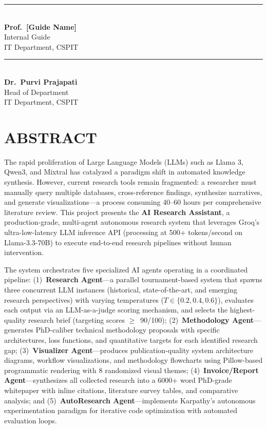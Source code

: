 \documentclass[a4paper,12pt,openany]{report}
\begin{document}
\vspace{2.5cm}
\begin{minipage}[t]{0.45\textwidth}
\centering
\rule{5cm}{0.4pt}\\
\textbf{Prof.\ [Guide Name]}\\
Internal Guide\\
IT Department, CSPIT
\end{minipage}
\hfill
\begin{minipage}[t]{0.45\textwidth}
\centering
\rule{5cm}{0.4pt}\\
\textbf{Dr.\ Purvi Prajapati}\\
Head of Department\\
IT Department, CSPIT
\end{minipage}

\chapter*{ABSTRACT}
The rapid proliferation of Large Language Models (LLMs) such as Llama 3, Qwen3, and Mixtral has catalyzed a paradigm shift in automated knowledge synthesis. However, current research tools remain fragmented: a researcher must manually query multiple databases, cross-reference findings, synthesize narratives, and generate visualizations---a process consuming 40--60 hours per comprehensive literature review. This project presents the \textbf{AI Research Assistant}, a production-grade, multi-agent autonomous research system that leverages Groq's ultra-low-latency LLM inference API (processing at 500+ tokens/second on Llama-3.3-70B) to execute end-to-end research pipelines without human intervention.

The system orchestrates five specialized AI agents operating in a coordinated pipeline: (1)~\textbf{Research Agent}---a parallel tournament-based system that spawns three concurrent LLM instances (historical, state-of-the-art, and emerging research perspectives) with varying temperatures ($T \in \{0.2, 0.4, 0.6\}$), evaluates each output via an LLM-as-a-judge scoring mechanism, and selects the highest-quality research brief (targeting scores $\geq$~90/100); (2)~\textbf{Methodology Agent}---generates PhD-caliber technical methodology proposals with specific architectures, loss functions, and quantitative targets for each identified research gap; (3)~\textbf{Visualizer Agent}---produces publication-quality system architecture diagrams, workflow visualizations, and methodology flowcharts using Pillow-based programmatic rendering with 8 randomized visual themes; (4)~\textbf{Invoice/Report Agent}---synthesizes all collected research into a 6000+ word PhD-grade whitepaper with inline citations, literature survey tables, and comparative analysis; and (5)~\textbf{AutoResearch Agent}---implements Karpathy's autonomous experimentation paradigm for iterative code optimization with automated evaluation loops.
\end{document}
